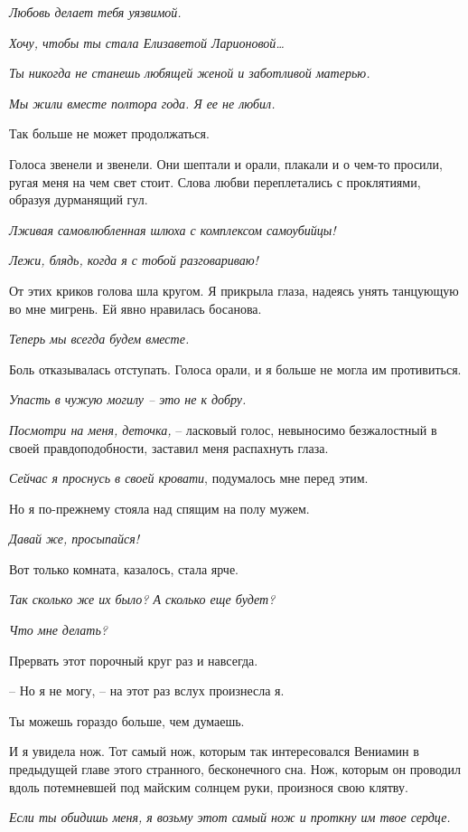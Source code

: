 \documentclass[
]{book}
\begin{document}
\emph{Любовь делает тебя уязвимой.}

\emph{Хочу, чтобы ты стала Елизаветой Ларионовой\ldots{}}

\emph{Ты никогда не станешь любящей женой и заботливой матерью.}

\emph{Мы жили вместе полтора года. Я ее не любил.}

Так больше не может продолжаться.

Голоса звенели и звенели. Они шептали и орали, плакали и о чем-то просили, ругая меня на чем свет стоит. Слова любви переплетались с проклятиями, образуя дурманящий гул.

\emph{Лживая самовлюбленная шлюха с комплексом самоубийцы!}

\emph{Лежи, блядь, когда я с тобой разговариваю!}

От этих криков голова шла кругом. Я прикрыла глаза, надеясь унять танцующую во мне мигрень. Ей явно нравилась босанова.

\emph{Теперь мы всегда будем вместе.}

Боль отказывалась отступать. Голоса орали, и я больше не могла им противиться.

\emph{Упасть в чужую могилу -- это не к добру.}

\emph{Посмотри на меня, деточка,} -- ласковый голос, невыносимо безжалостный в своей правдоподобности, заставил меня распахнуть глаза.

\emph{Сейчас я проснусь в своей кровати}, подумалось мне перед этим.

Но я по-прежнему стояла над спящим на полу мужем.

\emph{Давай же, просыпайся! }

Вот только комната, казалось, стала ярче.

\emph{Так сколько же их было? А сколько еще будет?}

\emph{Что мне делать?}

Прервать этот порочный круг раз и навсегда.

-- Но я не могу, -- на этот раз вслух произнесла я.

Ты можешь гораздо больше, чем думаешь.

И я увидела нож. Тот самый нож, которым так интересовался Вениамин в предыдущей главе этого странного, бесконечного сна. Нож, которым он проводил вдоль потемневшей под майским солнцем руки, произнося свою клятву.

\emph{Если ты обидишь меня, я возьму этот самый нож и проткну им твое сердце.}
\end{document}

